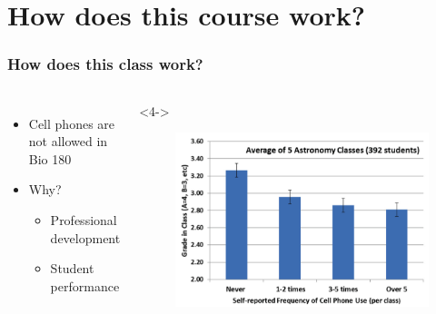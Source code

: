 \section{How does this course work?}


\begin{noheadline}
\begin{frame}
    \frametitle{How does this class work?}

    \begin{adjustwidth}{-1.5em}{-1em}
    \begin{columns}


        \begin{itemize}
            \item<1-> Cell phones are not allowed in Bio 180
            \item<2-> Why?
            \begin{itemize}
                \item<3-> Professional development
                \item<4-> Student performance
            \end{itemize}
        \end{itemize}


        \begin{uncoverenv}<4->
        \begin{figure}
            \begin{center}
            \includegraphics[width=1\textwidth]{cell-phone-data.png}
            \caption{\tiny {}}
            \end{center}
        \end{figure}
        \end{uncoverenv}

    \end{columns}
    \end{adjustwidth}
\end{frame}
\end{noheadline}

